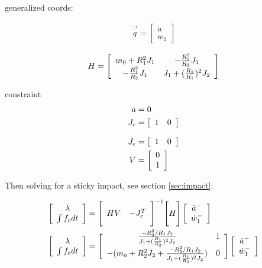generalized coords:

%
\begin{align}
\vec{\dot{q}} = \left[ \begin{array}{c} 	\dot{a} \\ w_1 \end{array} \right]
\label{eq:dsdm_impact_q}
\end{align}
%


%
\begin{align}
H = \left[ \begin{array}{c c} 	m_0 + R_1^2 J_1  &  -\frac{R_1^2}{R_2} J_1 \\ -\frac{R_1^2}{R_2} J_1  &  J_1 + (\frac{R_2}{R_1})^2 J_2 \end{array} \right]
\label{eq:dsdm_impact_H}
\end{align}
%

constraint
%
\begin{align}
\dot{a} &= 0 \\
J_c     &= \left[ \begin{array}{c c} 1 & 0 \end{array} \right]
\label{eq:dsdm_impact_const}
\end{align}
%

%
\begin{align}
J_c     &= \left[ \begin{array}{c c} 1 & 0 \end{array} \right] \\ 
V       &= \left[ \begin{array}{c} 0 \\ 1 \end{array} \right]
\label{eq:dsdm_impact_jaco}
\end{align}
%


Then solving for a sticky impact, see section \ref{sec:impact}:

%
\begin{align}
\left[ \begin{array}{c} \lambda \\ \int{f_c dt} \end{array} \right] &= \Bigg[ \begin{array}{c c} HV & -J_c^T \end{array} \Bigg]^{-1} \Bigg[ H \Bigg] \left[ \begin{array}{c} \dot{a}^- \\ \dot{w}_1^- \end{array} \right] \\
\left[ \begin{array}{c} \lambda \\ \int{f_c dt} \end{array} \right] &= \Bigg[ \begin{array}{c c} 
\frac{-R_2^2/R_1 J_2}{J_1+(\frac{R_1}{R_2})^2 J_2} & 1 \\
- (m_o + R_2^2 J_2+\frac{-R_2^2/R_1 J_2}{J_1+(\frac{R_1}{R_2})^2 J_2}) & 0 
\end{array} \Bigg] \left[ \begin{array}{c} \dot{a}^- \\ \dot{w}_1^- \end{array} \right]
\label{eq:dsdm_impact_sol}
\end{align}
%

